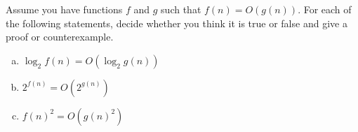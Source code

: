\problem{}

Assume you have functions $f$ and $g$ such that $f(n)= O(g(n))$. For each of the following statements, decide whether you think it is true or false and give a proof or counterexample.
\begin{enumerate}[a)]
\item $\log_2 f(n) = O(\log_2 g(n))$
\item $2^{f(n)} = O(2^{g(n)})$
\item  $f(n)^2= O(g(n)^2)$
\end{enumerate}

 \solution{
 
 }
 
\newpage